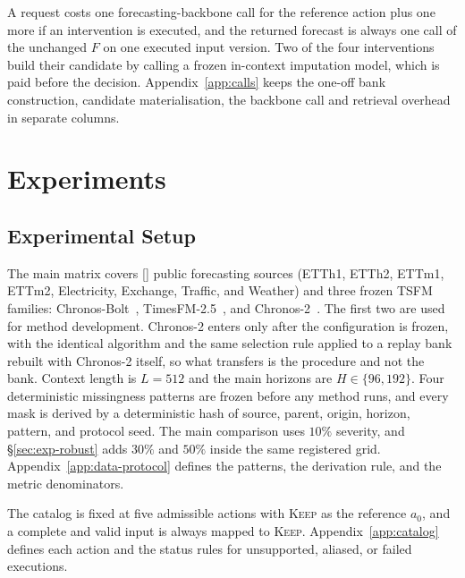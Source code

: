 \documentclass{article}
\newcommand{\ph}[1]{\textcolor{phgray}{\textsf{[\detokenize{#1}]}}}
\newcommand{\tsfm}{TSFM}
\begin{document}
A request costs one forecasting-backbone call for the reference action plus one more if an
intervention is executed, and the returned forecast is always one call of the unchanged $F$ on
one executed input version. Two of the four interventions build their candidate by calling a
frozen in-context imputation model, which is paid before the decision.
Appendix~\ref{app:calls} keeps the one-off bank construction, candidate materialisation, the
backbone call and retrieval overhead in separate columns.

\section{Experiments}
\label{sec:exp}

\subsection{Experimental Setup}
\label{sec:exp-setup}
The main matrix covers \ph{N_DATASETS} public forecasting sources (ETTh1, ETTh2, ETTm1, ETTm2,
Electricity, Exchange, Traffic, and Weather) and three frozen \tsfm{} families:
Chronos-Bolt~\citep{chronosbolt2025}, TimesFM-2.5~\citep{das2024timesfm}, and
Chronos-2~\citep{chronos2_2025}. The first two are used for method development. Chronos-2
enters only after the configuration is frozen, with the identical algorithm and the same
selection rule applied to a replay bank rebuilt with Chronos-2 itself, so what transfers is the
procedure and not the bank.
Context length is $L = 512$ and the main horizons are $H \in \{96, 192\}$. Four deterministic
missingness patterns are frozen before any method runs, and every mask is derived by a
deterministic hash of source, parent, origin, horizon, pattern, and protocol seed. The main
comparison uses $10\%$ severity, and \S\ref{sec:exp-robust} adds $30\%$ and $50\%$ inside the
same registered grid. Appendix~\ref{app:data-protocol} defines the patterns, the derivation
rule, and the metric denominators.

The catalog is fixed at five admissible actions with \textsc{Keep} as the reference $a_0$, and
a complete and valid input is always mapped to \textsc{Keep}. Appendix~\ref{app:catalog}
defines each action and the status rules for unsupported, aliased, or failed executions.
\end{document}
